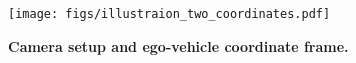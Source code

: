 \documentclass[10pt,twocolumn,letterpaper]{article}
\begin{document}
\begin{comment}
Suppose a 3D point $(x, y, z)$ from ego-vehicle coordinate frame is projected to a 2D image point $(u, v)$ through a projective transformation, its corresponding 2D point $(\bar{x}, \bar{y})$ from top-view coordinate frame is projected to the same 2D image point through a planar homography. Given camera orientation represented by rotation matrix $R$, translation $\boldsymbol{t} = -R \boldsymbol{C}$, and intrinsic matrix $K$, such relationship can be explicitly written in the following equation: 
{\small
\begin{gather}
\label{eqn:geo}
    \begin{bmatrix} u \\ v \\ 1 \end{bmatrix}
     =
    \alpha_1 K
    \begin{bmatrix}
        R & \boldsymbol{t}
    \end{bmatrix}
    \begin{bmatrix}
        x \\ y \\ z \\ 1
    \end{bmatrix}
    =
    \alpha_2 K
    \begin{bmatrix}
        R_{1:2} & \boldsymbol{t}
    \end{bmatrix}
    \begin{bmatrix}
        \bar{x} \\ \bar{y} \\ 1
    \end{bmatrix},
\end{gather}
}
\noindent where $R_{1:2}$ indicates the first two columns of $R$, and $\alpha_1$, $\alpha_2$ indicate scale factors. At the first glance, direct deriving the transformation between $(\bar{x}, \bar{y})$ and $(x, y, z)$ might be algebraically complicated, which may also require to break down the rotation matrix explicitly. However, deriving from a geometric perspective is far simpler than from a algebraic perspective. \end{comment}
\begin{figure}[!h]
  \centering
  \texttt{[image: figs/illustraion\_two\_coordinates.pdf]}
\caption{\textbf{Camera setup and ego-vehicle coordinate frame.}} \label{fig:coord:sys}
\end{figure}
\end{document}
